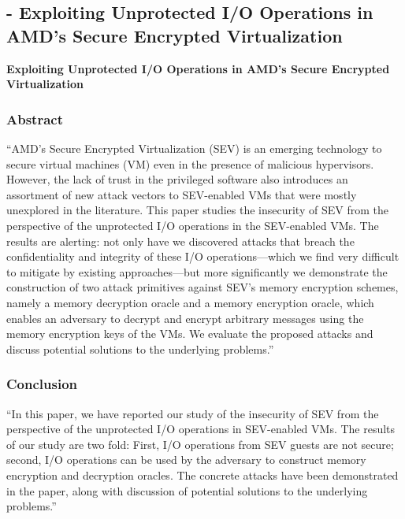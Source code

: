
\subsection{\cite{li_exploiting_2019} - Exploiting Unprotected I/O Operations in AMD’s Secure Encrypted Virtualization }

\textbf{Exploiting Unprotected I/O Operations in AMD’s Secure Encrypted Virtualization }

\subsubsection*{Abstract  \cite{li_exploiting_2019}}
“AMD’s Secure Encrypted Virtualization (SEV) is an emerging technology to secure virtual machines (VM) even in the presence of malicious hypervisors. However, the lack of trust in the privileged software also introduces an assortment of new attack vectors to SEV-enabled VMs that were mostly unexplored in the literature. This paper studies the insecurity of SEV from the perspective of the unprotected I/O operations in the SEV-enabled VMs. The results are alerting: not only have we discovered attacks that breach the confidentiality and integrity of these I/O operations—which we find very difficult to mitigate by existing approaches—but more significantly we demonstrate the construction of two attack primitives against SEV’s memory encryption schemes, namely a memory decryption oracle and a memory encryption oracle, which enables an adversary to decrypt and encrypt arbitrary messages using the memory encryption keys of the VMs. We evaluate the proposed attacks and discuss potential solutions to the underlying problems.” 

\subsubsection*{Conclusion  \cite{li_exploiting_2019}}
“In this paper, we have reported our study of the insecurity of SEV from the perspective of the unprotected I/O operations in SEV-enabled VMs. The results of our study are two fold: First, I/O operations from SEV guests are not secure; second, I/O operations can be used by the adversary to construct memory encryption and decryption oracles. The concrete attacks have been demonstrated in the paper, along with discussion of potential solutions to the underlying problems.”

